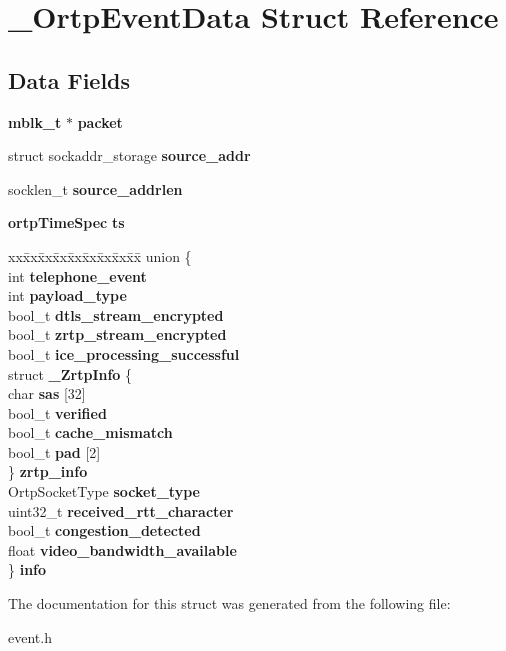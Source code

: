 \section{\+\_\+\+Ortp\+Event\+Data Struct Reference}
\label{struct__OrtpEventData}
\subsection*{Data Fields}
\begin{DoxyCompactItemize}
\item 
\mbox{\label{struct__OrtpEventData_a5a5f87b5ded5235bdaba249dfb138a02}} 
\textbf{ mblk\+\_\+t} $\ast$ {\bfseries packet}
\item 
\mbox{\label{struct__OrtpEventData_ad1989d26af045f405bba648db94e91b0}} 
struct sockaddr\+\_\+storage {\bfseries source\+\_\+addr}
\item 
\mbox{\label{struct__OrtpEventData_a9a59f46db804df4c88814d3b63dddfde}} 
socklen\+\_\+t {\bfseries source\+\_\+addrlen}
\item 
\mbox{\label{struct__OrtpEventData_a29f1db4cd5bd2812f43093cf185e4e9b}} 
\textbf{ ortp\+Time\+Spec} {\bfseries ts}
\item 
\mbox{\label{struct__OrtpEventData_ad23157561be699a683adb9325a5377f5}} 
\begin{tabbing}
xx\=xx\=xx\=xx\=xx\=xx\=xx\=xx\=xx\=\kill
union \{\\
\>int {\bfseries telephone\_event}\\
\>int {\bfseries payload\_type}\\
\>bool\_t {\bfseries dtls\_stream\_encrypted}\\
\>bool\_t {\bfseries zrtp\_stream\_encrypted}\\
\>bool\_t {\bfseries ice\_processing\_successful}\\
\>struct {\bfseries \_ZrtpInfo} \{\\
\>\>char {\bfseries sas} [32]\\
\>\>bool\_t {\bfseries verified}\\
\>\>bool\_t {\bfseries cache\_mismatch}\\
\>\>bool\_t {\bfseries pad} [2]\\
\>\} {\bfseries zrtp\_info}\\
\>OrtpSocketType {\bfseries socket\_type}\\
\>uint32\_t {\bfseries received\_rtt\_character}\\
\>bool\_t {\bfseries congestion\_detected}\\
\>float {\bfseries video\_bandwidth\_available}\\
\} {\bfseries info}\\

\end{tabbing}\end{DoxyCompactItemize}


The documentation for this struct was generated from the following file\+:\begin{DoxyCompactItemize}
\item 
event.\+h\end{DoxyCompactItemize}
